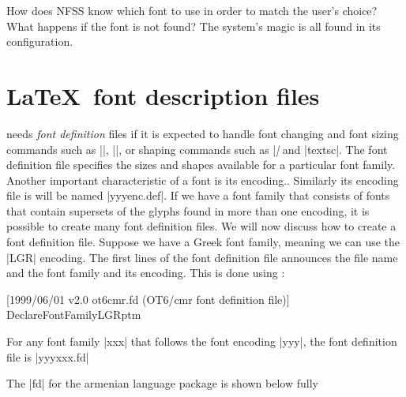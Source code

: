 \begin{multicols}{2}
How does NFSS know which font to use in order to match the user's choice? What happens if the font is not found? The system's magic is all found in its configuration. 


\section{\protect\LaTeX\ font description files}
\latex needs \textit{font definition} files if it is expected to handle font changing and font sizing commands such as |\large|, |\tiny|, or shaping commands such as |\textit| and |textsc|. The font definition file specifies the sizes and shapes available for a particular font family. Another important characteristic of a font is its encoding.. Similarly its encoding file is will be named |yyyenc.def|. If we have a font family that consists of fonts that contain supersets of the glyphs found in more than one encoding, it is possible to create many font definition files. We will now discuss how to create a font definition file. Suppose we have a Greek font family, meaning we can use the |LGR| encoding. The first lines of the font definition file announces the file name and the font family and its encoding. This is done using :

\begin{teX}
     [1999/06/01 v2.0 ot6cmr.fd (OT6/cmr font definition file)]
   DeclareFontFamily{LGR}{ptm}{}
\end{teX}



For any font family |xxx| that follows the font encoding |yyy|, the font definition file is |yyyxxx.fd| 


The |fd| for the armenian language package  is shown below fully
\end{multicols}
